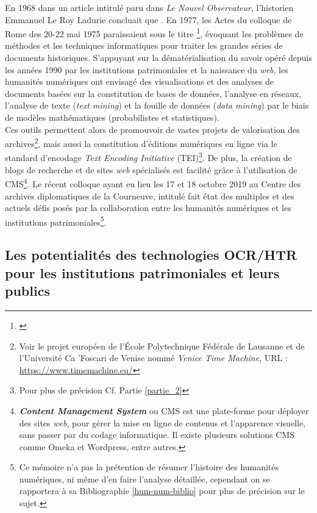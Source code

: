En 1968 dans un article intitulé  paru dans \textit{Le Nouvel Observateur}, l'historien Emmanuel Le Roy Ladurie concluait que . En 1977, les Actes du colloque de Rome des 20-22 mai 1975 paraissaient sous le titre \footnote{\cite{fossier_informatique_1977}}, évoquant les problèmes de méthodes et les techniques informatiques pour traiter les grandes séries de documents historiques. S'appuyant sur la dématérialisation du savoir opéré depuis les années 1990 par les institutions patrimoniales et la naissance du \textit{web}, les humanités numériques ont envisagé des visualisations et des analyses de documents basées sur la constitution de bases de données, l'analyse en réseaux, l'analyse de texte (\textit{text mining}) et la fouille de données (\textit{data mining}) par le biais de modèles mathématiques (probabilistes et statistiques).\\
\newpage
Ces outils permettent alors de promouvoir de vastes projets de valorisation des archives\footnote{Voir le projet européen de l'École Polytechnique Fédérale de Lausanne et de l'Université Ca 'Foscari de Venise nommé  \textit{Venice Time Machine}, URL : \url{https://www.timemachine.eu/}}, mais aussi la constitution d'éditions numériques en ligne via le standard d'encodage \textit{Text Encoding Initiative} (TEI)\footnote{Pour plus de précision Cf. Partie \ref{partie_2}}. De plus, la création de blogs de recherche et de sites \textit{web} spécialisés est facilité grâce à l'utilisation de CMS\footnote{\textbf{\textit{Content Management System}} ou CMS est une plate-forme pour déployer des sites \textit{web}, pour gérer la mise en ligne de contenus et l'apparence visuelle, sans passer par du codage informatique. Il existe plusieurs solutions CMS comme Omeka et Wordpress, entre autres.}.
Le récent colloque ayant eu lieu les 17 et 18 octobre 2019 au Centre des archives diplomatiques de la Courneuve, intitulé  fait état des multiples et des actuels défis posés par la collaboration entre les humanités numériques et les institutions patrimoniales\footnote{Ce mémoire n'a pas la prétention de résumer l'histoire des humanités numériques, ni même d'en faire l'analyse détaillée, cependant on se rapportera à sa Bibliographie \ref{hum-num-biblio} pour plus de précision sur le sujet.}.

\subsection{Les potentialités des technologies OCR/HTR pour les institutions patrimoniales et leurs publics} 

